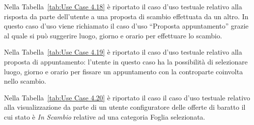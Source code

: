 Nella Tabella~\ref{tab:Use Case 4.18} è riportato il caso d'uso testuale relativo alla risposta da parte dell'utente a una proposta di scambio effettuata da un altro. In questo caso d'uso viene richiamato il caso d'uso ``Proposta appuntamento'' grazie al quale si può suggerire luogo, giorno e orario per effettuare lo scambio.\bigskip

Nella Tabella~\ref{tab:Use Case 4.19} è riportato il caso d'uso testuale relativo alla proposta di appuntamento: l'utente in questo caso ha la possibilità di selezionare luogo, giorno e orario per fissare un appuntamento con la controparte coinvolta nello scambio.\bigskip 

Nella Tabella~\ref{tab:Use Case 4.20} è riportato il caso il caso d'uso testuale relativo alla visualizzazione da parte di un utente configuratore delle offerte di baratto il cui stato è \textit{In Scambio} relative ad una categoria Foglia selezionata.\bigskip